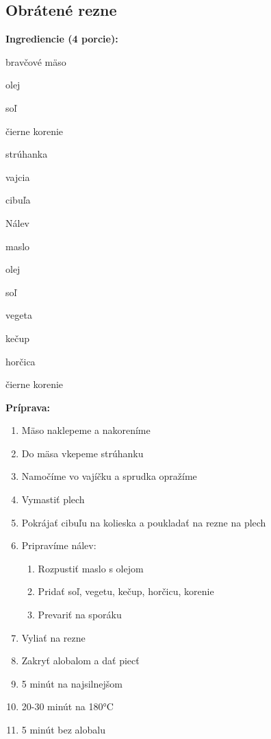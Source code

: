 \setcounter{step}{0}

\subsection{ Obrátené rezne }

\begin{ingredient}
  
  \def\portions{  }
  \textbf{ {\normalsize Ingrediencie (4 porcie):} }

  \begin{main}
      \item bravčové mäso
      \item olej
      \item soľ
      \item čierne korenie
      \item strúhanka
      \item vajcia
      \item cibuľa
  \end{main}
  
    \begin{subingredient}{Nálev}
        \item maslo
        \item olej
        \item soľ
        \item vegeta
        \item kečup
        \item horčica
        \item čierne korenie
    \end{subingredient}
  
\end{ingredient}
\begin{recipe}
\textbf{ {\normalsize Príprava:} }
\begin{enumerate}

  \item{Mäso naklepeme a nakoreníme}
  \item{Do mäsa vkepeme strúhanku}
  \item{Namočíme vo vajíčku a sprudka opražíme}
  \item{Vymastiť plech}
  \item{Pokrájať cibuľu na kolieska a poukladať na rezne na plech}
  \item{Pripravíme nálev: }
      \begin{enumerate}
          \item{Rozpustiť maslo s olejom}
          \item{Pridať soľ, vegetu, kečup, horčicu, korenie}
          \item{Prevariť na sporáku}\end{enumerate}
  \item{Vyliať na rezne}
  \item{Zakryť alobalom a dať piecť}
  \item{5 minút na najsilnejšom}
  \item{20-30 minút na 180°C}
  \item{5 minút bez alobalu}

\end{enumerate}
\end{recipe}

\begin{notes}
  
\end{notes}	
\clearpage
